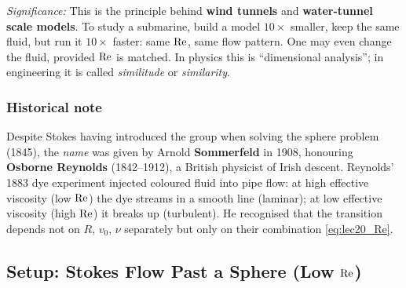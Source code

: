 \documentclass[../main.tex]{subfiles}
\begin{document}
\textit{Significance:} This is the principle behind \textbf{wind tunnels} and \textbf{water-tunnel scale models}. To study a submarine, build a model $10\times$ smaller, keep the same fluid, but run it $10\times$ faster: same $\mathrm{Re}$, same flow pattern. One may even change the fluid, provided $\mathrm{Re}$ is matched. In physics this is ``dimensional analysis''; in engineering it is called \emph{similitude} or \emph{similarity}.

\subsubsection*{Historical note}
Despite Stokes having introduced the group when solving the sphere problem (1845), the \emph{name} was given by Arnold \textbf{Sommerfeld} in 1908, honouring \textbf{Osborne Reynolds} (1842--1912), a British physicist of Irish descent. Reynolds' 1883 dye experiment injected coloured fluid into pipe flow: at high effective viscosity (low $\mathrm{Re}$) the dye streams in a smooth line (laminar); at low effective viscosity (high $\mathrm{Re}$) it breaks up (turbulent). He recognised that the transition depends not on $R$, $v_0$, $\nu$ separately but only on their combination \eqref{eq:lec20_Re}.

\subsection{Setup: Stokes Flow Past a Sphere (Low \texorpdfstring{$\mathrm{Re}$}{Re})}\label{sec:lec20:stokes}
\end{document}
